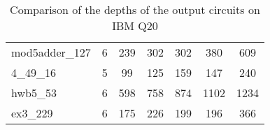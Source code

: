 \documentclass[journal]{IEEEtran}
\begin{document}
\begin{table*}[htbp]
\begin{center}
\begin{tabular}{|p{4.3cm}<{\centering}|c|c|c|c|c|c|}
                        mod5adder\_127 & 6 & 239 & 302 & 302 & 380 & 609 \\ 
                        4\_49\_16 & 5 & 99 & 125 & 159 & 147 & 240 \\ 
                        hwb5\_53 & 6 & 598 & 758 & 874 & 1102 & 1234 \\ 
                        ex3\_229 & 6 & 175 & 226 & 199 & 196 & 366 \\ 
                    \hline
                        \end{tabular} 
                        \end{center} 	
                        \caption{Comparison of  the depths of the output circuits on  IBM Q20} 
                        \label{tab6}
                    \end{table*}
\end{document}
